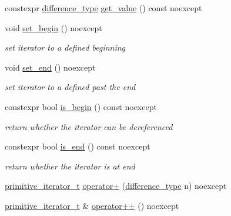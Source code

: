 \begin{DoxyCompactItemize}
\item 
constexpr \hyperlink{classnlohmann_1_1detail_1_1primitive__iterator__t_af3db0d5c90de427d51645fe73a015553}{difference\+\_\+type} \hyperlink{classnlohmann_1_1detail_1_1primitive__iterator__t_ae952990886ca1756229f916661a8af81}{get\+\_\+value} () const noexcept
\item 
void \hyperlink{classnlohmann_1_1detail_1_1primitive__iterator__t_a9d9b005906106e12aed738f97d7fee42}{set\+\_\+begin} () noexcept
\begin{DoxyCompactList}\small\item\em set iterator to a defined beginning \end{DoxyCompactList}\item 
void \hyperlink{classnlohmann_1_1detail_1_1primitive__iterator__t_ad26a823483846a12d890c3feed3097eb}{set\+\_\+end} () noexcept
\begin{DoxyCompactList}\small\item\em set iterator to a defined past the end \end{DoxyCompactList}\item 
constexpr bool \hyperlink{classnlohmann_1_1detail_1_1primitive__iterator__t_a8d1a7d46b3fcd06edd034f04ededb5e4}{is\+\_\+begin} () const noexcept
\begin{DoxyCompactList}\small\item\em return whether the iterator can be dereferenced \end{DoxyCompactList}\item 
constexpr bool \hyperlink{classnlohmann_1_1detail_1_1primitive__iterator__t_a45a7e301c23b5b90417baf2277f40b1d}{is\+\_\+end} () const noexcept
\begin{DoxyCompactList}\small\item\em return whether the iterator is at end \end{DoxyCompactList}\item 
\hyperlink{classnlohmann_1_1detail_1_1primitive__iterator__t}{primitive\+\_\+iterator\+\_\+t} \hyperlink{classnlohmann_1_1detail_1_1primitive__iterator__t_a00ce828d0fe58046c10e0445504df7bf}{operator+} (\hyperlink{classnlohmann_1_1detail_1_1primitive__iterator__t_af3db0d5c90de427d51645fe73a015553}{difference\+\_\+type} n) noexcept
\item 
\hyperlink{classnlohmann_1_1detail_1_1primitive__iterator__t}{primitive\+\_\+iterator\+\_\+t} \& \hyperlink{classnlohmann_1_1detail_1_1primitive__iterator__t_ad26511012fc88f3ec5d9e1cb708732fd}{operator++} () noexcept

\end{DoxyCompactItemize}
